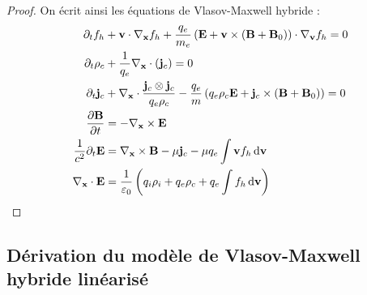 \begin{proof}
  On écrit ainsi les équations de Vlasov-Maxwell hybride :
  \begin{align}
      \partial_t f_h &+ \vb{v}\cdot\nabla_{\vb{x}} f_h + \frac{q_e}{m_e}\left( \vb{E} + \vb{v}\times(\vb{B}+\vb{B}_0) \right)\cdot\nabla_{\vb{v}} f_h = 0 \\
      \partial_t\rho_c &+ \frac{1}{q_e}\nabla_{\vb{x}}\cdot(\vb{j}_c) = 0 \\
      \partial_t\vb{j}_c &+ \nabla_{\vb{x}}\cdot\frac{\vb{j}_c\otimes\vb{j}_c}{q_e\rho_c} - \frac{q_e}{m}\left( q_e\rho_c\vb{E} + \vb{j}_c\times(\vb{B}+\vb{B}_0) \right) = 0 \\
      \pdv{\vb{B}}{t} &= - \nabla_{\vb{x}}\times\vb{E} \\
      \frac{1}{c^2}\partial_t\vb{E} &= \nabla_{\vb{x}}\times \vb{B} - \mu\vb{j}_c - \mu q_e\int \vb{v} f_h\dd{\vb{v}} \\
      \nabla_{\vb{x}}\cdot\vb{E} &= \frac{1}{\varepsilon_0}\left( q_i\rho_i + q_e\rho_c + q_e\int f_h\dd{\vb{v}} \right)
  \end{align}
\end{proof}

\subsection{Dérivation du modèle de Vlasov-Maxwell hybride linéarisé}
\label{ssec:0:vmhl}

